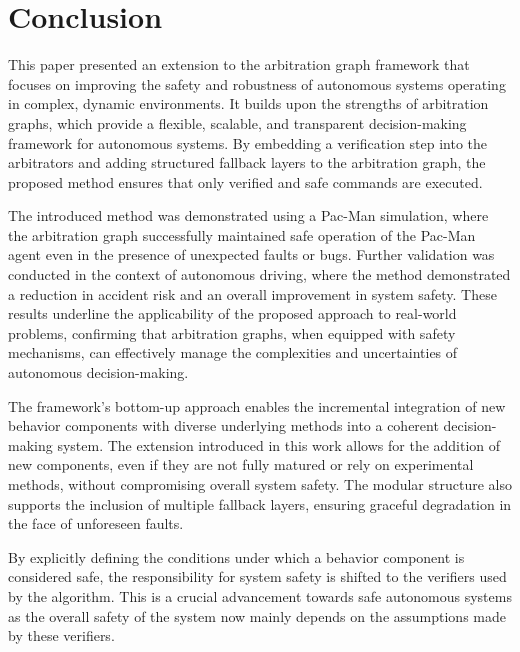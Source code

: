 \section{Conclusion}
This paper presented an extension to the arbitration graph framework that focuses on improving the safety and robustness of autonomous systems operating in complex, dynamic environments.
It builds upon the strengths of arbitration graphs, which provide a flexible, scalable, and transparent decision-making framework for autonomous systems.
By embedding a verification step into the arbitrators and adding structured fallback layers to the arbitration graph,
the proposed method ensures that only verified and safe commands are executed.

The introduced method was demonstrated using a Pac-Man simulation, where the arbitration graph successfully maintained safe operation of the Pac-Man agent even in the presence of unexpected faults or bugs.
%
Further validation was conducted in the context of autonomous driving, where the method demonstrated a reduction in accident risk and an overall improvement in system safety.
These results underline the applicability of the proposed approach to real-world problems, 
confirming that arbitration graphs, when equipped with safety mechanisms, 
can effectively manage the complexities and uncertainties of autonomous decision-making.

The framework’s bottom-up approach enables the incremental integration of new behavior components with diverse underlying methods into a coherent decision-making system.
The extension introduced in this work allows for the addition of new components, even if they are not fully matured or rely on experimental methods, without compromising overall system safety.
The modular structure also supports the inclusion of multiple fallback layers, ensuring graceful degradation in the face of unforeseen faults.

By explicitly defining the conditions under which a behavior component is considered safe,
the responsibility for system safety is shifted to the verifiers used by the algorithm.
This is a crucial advancement towards safe autonomous systems as
the overall safety of the system now mainly depends on the assumptions made by these verifiers.

